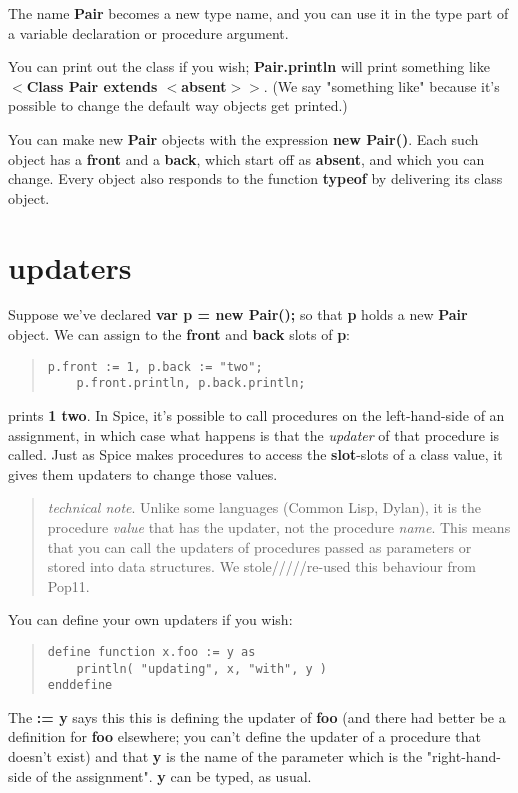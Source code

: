 \documentclass{report}
\begin{document}
The name {\bf Pair} becomes a new type name, and you can use it in the type part
of a variable declaration or procedure argument.

You can print out the class if you wish; {\bf Pair.println} will print something
like {\bf $<$Class Pair extends $<$absent$>$$>$}. (We say "something like" because it's
possible to change the default way objects get printed.)

You can make new {\bf Pair} objects with the expression {\bf new Pair()}. Each such
object has a {\bf front} and a {\bf back}, which start off as {\bf absent}, and which you
can change. Every object also responds to the function {\bf typeof} by delivering
its class object.\section{updaters}


Suppose we've declared {\bf var p = new Pair();} so that {\bf p} holds a new {\bf Pair}
object. We can assign to the {\bf front} and {\bf back} slots of {\bf p}:

\begin{quote}
\begin{verbatim}
p.front := 1, p.back := "two";
    p.front.println, p.back.println;
\end{verbatim}
\end{quote}
prints {\bf 1 two}. In Spice, it's possible to call procedures
on the left-hand-side of an assignment, in which case what happens is that
the {\em updater} of that procedure is called. Just as Spice makes procedures
to access the {\bf slot}-slots of a class value, it gives them updaters
to change those values.

\begin{quote}{\em technical note}. Unlike some languages (Common Lisp, Dylan), it is the
procedure {\em value} that has the updater, not the procedure {\em name}. This means
that you can call the updaters of procedures passed as parameters or stored
into data structures. We stole/////re-used this behaviour from Pop11.
\end{quote}You can define your own updaters if you wish:

\begin{quote}
\begin{verbatim}
define function x.foo := y as
    println( "updating", x, "with", y )
enddefine
\end{verbatim}
\end{quote}
The {\bf := y} says this this is defining the updater of {\bf foo} (and there had
better be a definition for {\bf foo} elsewhere; you can't define the updater of a
procedure that doesn't exist) and that {\bf y} is the name of the parameter which
is the "right-hand-side of the assignment". {\bf y} can be typed, as usual.
\end{document}
